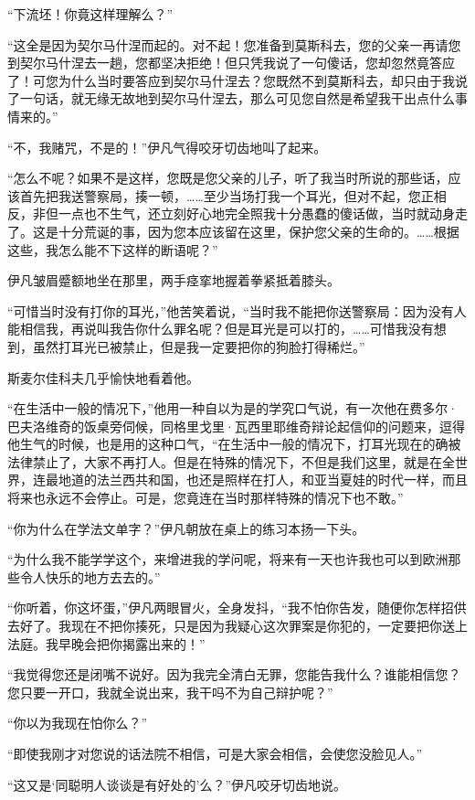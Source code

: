 \par “下流坯！你竟这样理解么？”
\par “这全是因为契尔马什涅而起的。对不起！您准备到莫斯科去，您的父亲一再请您到契尔马什涅去一趟，您都坚决拒绝！但只凭我说了一句傻话，您却忽然竟答应了！可您为什么当时要答应到契尔马什涅去？您既然不到莫斯科去，却只由于我说了一句话，就无缘无故地到契尔马什涅去，那么可见您自然是希望我干出点什么事情来的。”
\par “不，我赌咒，不是的！”伊凡气得咬牙切齿地叫了起来。
\par “怎么不呢？如果不是这样，您既是您父亲的儿子，听了我当时所说的那些话，应该首先把我送警察局，揍一顿，……至少当场打我一个耳光，但对不起，您正相反，非但一点也不生气，还立刻好心地完全照我十分愚蠢的傻话做，当时就动身走了。这是十分荒诞的事，因为您本应该留在这里，保护您父亲的生命的。……根据这些，我怎么能不下这样的断语呢？”
\par 伊凡皱眉蹙额地坐在那里，两手痉挛地握着拳紧抵着膝头。
\par “可惜当时没有打你的耳光，”他苦笑着说，“当时我不能把你送警察局：因为没有人能相信我，再说叫我告你什么罪名呢？但是耳光是可以打的，……可惜我没有想到，虽然打耳光已被禁止，但是我一定要把你的狗脸打得稀烂。”
\par 斯麦尔佳科夫几乎愉快地看着他。
\par “在生活中一般的情况下，”他用一种自以为是的学究口气说，有一次他在费多尔·巴夫洛维奇的饭桌旁伺候，同格里戈里·瓦西里耶维奇辩论起信仰的问题来，逗得他生气的时候，也是用的这种口气，“在生活中一般的情况下，打耳光现在的确被法律禁止了，大家不再打人。但是在特殊的情况下，不但是我们这里，就是在全世界，连最地道的法兰西共和国，也还是照样在打人，和亚当夏娃的时代一样，而且将来也永远不会停止。可是，您竟连在当时那样特殊的情况下也不敢。”
\par “你为什么在学法文单字？”伊凡朝放在桌上的练习本扬一下头。
\par “为什么我不能学学这个，来增进我的学问呢，将来有一天也许我也可以到欧洲那些令人快乐的地方去去的。”
\par “你听着，你这坏蛋，”伊凡两眼冒火，全身发抖，“我不怕你告发，随便你怎样招供去好了。我现在不把你揍死，只是因为我疑心这次罪案是你犯的，一定要把你送上法庭。我早晚会把你揭露出来的！”
\par “我觉得您还是闭嘴不说好。因为我完全清白无罪，您能告我什么？谁能相信您？您只要一开口，我就全说出来，我干吗不为自己辩护呢？”
\par “你以为我现在怕你么？”
\par “即使我刚才对您说的话法院不相信，可是大家会相信，会使您没脸见人。”
\par “这又是‘同聪明人谈谈是有好处的’么？”伊凡咬牙切齿地说。
